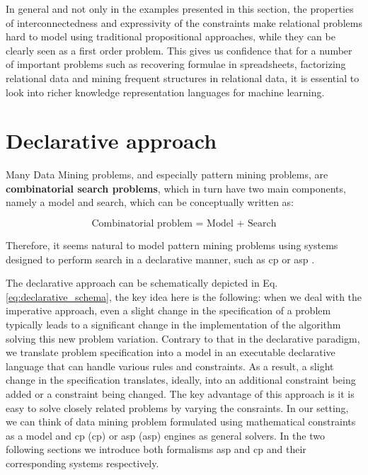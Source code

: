 In general and not only in the examples presented in this section, the
properties of interconnectedness and expressivity of the constraints
make relational problems hard to model using traditional propositional
approaches, while they can be clearly seen as a first order problem. This gives us confidence that for a number of important problems such as recovering formulae in spreadsheets, factorizing relational data and mining frequent structures in relational data, it is essential to look into richer knowledge representation languages for machine learning.

\section{Declarative approach}\label{sec:declarative_intro}
Many Data Mining problems, and especially pattern mining
problems, are \textbf{combinatorial search problems}, which in turn
have two main components, namely a model and search, which can be
conceptually written as:

\begin{center}
\begin{equation}\label{eq:declarative_schema}
  \text{Combinatorial problem = Model + Search}
\end{equation}
\end{center}

Therefore, it seems natural to model pattern mining problems 
using systems designed to perform search in a declarative manner, such
as \acrlong{cp} \parencite{handbookcp} or \acrlong{asp}
\parencite{whatisasp}. %

\pubrev


The declarative approach can be schematically depicted in Eq.
\ref{eq:declarative_schema}, the key idea here is the following: when
we deal with the imperative approach, even a slight change in the
specification of a problem typically leads to a significant change in
the implementation of the algorithm solving this new problem
variation. Contrary to that in the declarative paradigm, we translate
problem specification into a model in an executable declarative language that can
handle various rules and constraints. As a result, a slight change in
the specification translates, ideally, into an additional constraint
being added or a constraint being changed. The key advantage of this
approach is it is easy to solve  closely related problems by varying
the consraints. In our setting, we can think of data
mining problem formulated using mathematical constraints as a
model and \acrlong{cp} (\acrshort{cp}) or \acrlong{asp}
(\acrshort{asp}) engines
as general solvers. In the two following sections we introduce both
formalisms \acrshort{asp} and \acrshort{cp} and their corresponding systems respectively.



